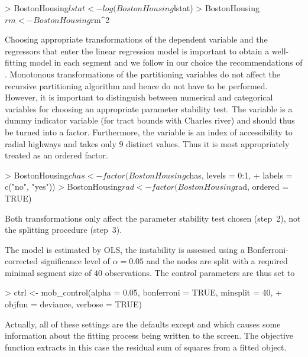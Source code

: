 \documentclass{Z}
\begin{document}
\begin{Schunk}
\begin{Sinput}
> BostonHousing$lstat <- log(BostonHousing$lstat)
> BostonHousing$rm <- BostonHousing$rm^2
\end{Sinput}
\end{Schunk}

Choosing appropriate
transformations of the dependent variable and the regressors that enter the linear
regression model is important to obtain a well-fitting model in each segment and
we follow in our choice the recommendations of \cite{BreimanFriedman1985}. Monotonous
transformations of the partitioning variables do not affect the recursive partitioning
algorithm and hence do not have to be performed. However, it is important to distinguish
between numerical and categorical variables for choosing an appropriate parameter 
stability test. The variable  is a dummy indicator variable (for tract bounds
with Charles river) and should thus be turned into a factor. Furthermore, the variable
 is an index of accessibility to radial highways and takes only 9 distinct
values. Thus it is most appropriately treated as an ordered factor.

\begin{Schunk}
\begin{Sinput}
> BostonHousing$chas <- factor(BostonHousing$chas, levels = 0:1, 
+     labels = c("no", "yes"))
> BostonHousing$rad <- factor(BostonHousing$rad, ordered = TRUE)
\end{Sinput}
\end{Schunk}

Both transformations only affect the parameter stability test chosen (step~2), not the splitting
procedure (step~3).

The model is estimated
by OLS, the instability is assessed using a Bonferroni-corrected
significance level of $\alpha = 0.05$ and the nodes are split with a required minimal
segment size of $40$ observations. The control parameters are thus set to

\begin{Schunk}
\begin{Sinput}
> ctrl <- mob_control(alpha = 0.05, bonferroni = TRUE, minsplit = 40, 
+     objfun = deviance, verbose = TRUE)
\end{Sinput}
\end{Schunk}

Actually, all of these settings are the defaults except  and
 which causes some information about the fitting process
being written to the screen. The objective function  extracts in
this case the residual sum of squares from a fitted  object.
\end{document}

